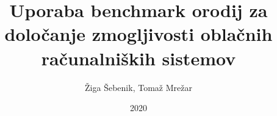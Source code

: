 \documentclass[slovene]{book}
\begin{document}
\hypersetup{pageanchor=false}

\author{Žiga Šebenik, Tomaž Mrežar}
\title{Uporaba benchmark orodij za določanje zmogljivosti oblačnih računalniških sistemov}
\date{2020}
\maketitle

\frontmatter
\tableofcontents


\mainmatter

 
% 

\backmatter
%
%
\end{document}
